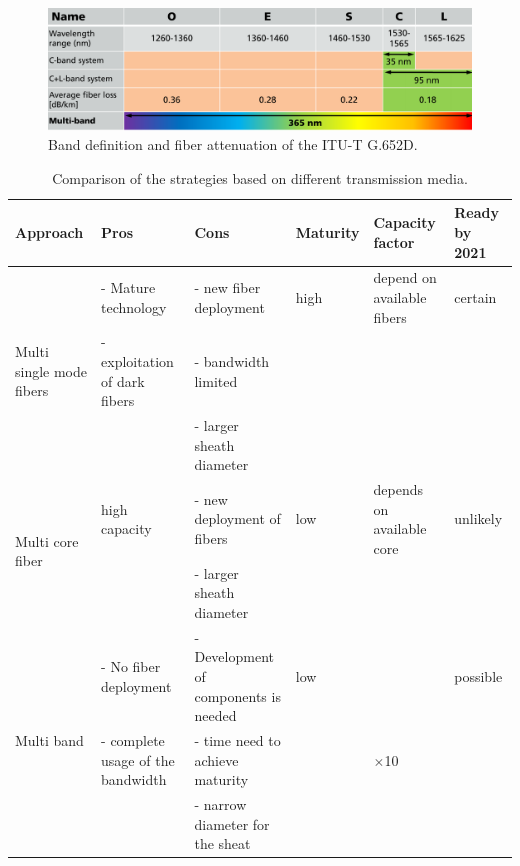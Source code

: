 \documentclass[journal]{IEEEtran}
\begin{document}
%
\begin{figure}[!htb]
\center
\includegraphics[width=1\linewidth]{Figures/Sec_II/Lambda_Tabelle.pdf}
\caption{Band definition and fiber attenuation of the ITU-T G.652D.}
\label{fig:multi-band_definition}
\end{figure}
%
%   
\begin{table}[ht!]
\centering
\caption{Comparison of the strategies based on different transmission media.}
\begin{tabular}{|p{3cm}|p{3.75cm}|p{3.75cm}|p{1.5cm}|p{1.5cm}|p{1.25cm}|}
\hline
\textbf{Approach} & \textbf{Pros} & \textbf{Cons} & \textbf{Maturity} & \textbf{Capacity factor} & \textbf{Ready by 2021}\\
\hline \hline
%
\multirow{3}{*}{Multi single mode fibers} & - Mature technology & - new fiber deployment & high & depend on available fibers & certain\\ 
& - exploitation of dark fibers & - bandwidth limited & &  & \\ 
& & - larger sheath diameter & & &\\ \hline
%
\multirow{2}{*}{Multi core fiber} & high capacity & - new deployment of fibers & low & depends on available core & unlikely\\ 
& & - larger sheath diameter & & & \\ \hline
%
\multirow{3}{*}{Multi band} & - No fiber deployment & - Development of components is needed & low & & possible\\ 
& - complete usage of the bandwidth & - time need to achieve maturity & & $\times$10 & \\ 
& & - narrow diameter for the sheat & & & \\ \hline
%
\end{tabular} 
\label{Table:comparison}
\end{table}
\end{document}
